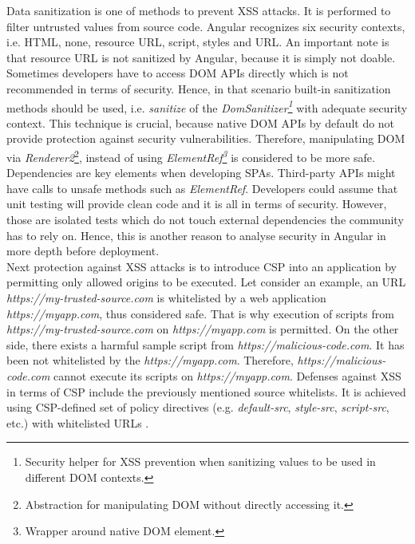 \documentclass{article} %
\begin{document}
\newline
Data sanitization is one of methods to prevent XSS attacks. It is performed to filter untrusted values from source code. Angular recognizes six security contexts, i.e. HTML, none, resource URL, script, styles and URL. An important note is that resource URL is not sanitized by Angular, because it is simply not doable. Sometimes developers have to access DOM APIs directly which is not recommended in terms of security. Hence, in that scenario built-in sanitization methods should be used, i.e. \textit{sanitize} of the \textit{DomSanitizer\footnote{Security helper for XSS prevention when sanitizing values to be used in different DOM contexts.}} with adequate security context. This technique is crucial, because native DOM APIs by default do not provide protection against security vulnerabilities. Therefore, manipulating DOM via \textit{Renderer2}\footnote{Abstraction for manipulating DOM without directly accessing it.}, instead of using \textit{ElementRef\footnote{Wrapper around native DOM element.}} is considered to be more safe. Dependencies are key elements when developing SPAs. Third-party APIs might have calls to unsafe methods such as \textit{ElementRef}. Developers could assume that unit testing will provide clean code and it is all in terms of security. However, those are isolated tests which do not touch external dependencies the community has to rely on. Hence, this is another reason to analyse security in Angular in more depth before deployment.\\
\newline
Next protection against XSS attacks is to introduce CSP into an application by permitting only allowed origins to be executed. Let consider an example, an URL \textit{https://my-trusted-source.com} is whitelisted by a web application \textit{https://myapp.com}, thus considered safe. That is why execution of scripts from \textit{https://my-trusted-source.com} on \textit{https://myapp.com} is permitted. On the other side, there exists a harmful sample script from \textit{https://malicious-code.com}. It has been not whitelisted by the \textit{https://myapp.com}. Therefore, \textit{https://malicious-code.com} cannot execute its scripts on \textit{https://myapp.com}. Defenses against XSS in terms of CSP include the previously mentioned source whitelists. It is achieved using CSP-defined set of policy directives (e.g. \textit{default-src}, \textit{style-src}, \textit{script-src}, etc.) with whitelisted URLs \cite{bib:csp_reference}.\\
\end{document}
